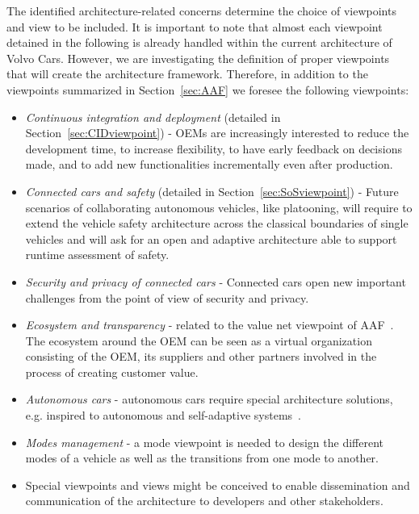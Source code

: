 The identified architecture-related concerns determine the choice of viewpoints and view to be included. 
It is important to note that almost each viewpoint detained in the following is already handled within the current architecture of Volvo Cars. However, we are investigating the definition of proper viewpoints that will create the architecture framework. %
Therefore, in addition to the viewpoints summarized in Section~\ref{sec:AAF} we foresee the following viewpoints:
	\begin{itemize}
	\item \emph{Continuous integration and deployment} (detailed in Section~\ref{sec:CIDviewpoint}) - OEMs are increasingly interested to reduce the development time, to increase flexibility, to have early feedback on decisions made, and to add new functionalities incrementally even after production. %
	\item \emph{Connected cars and safety} (detailed in Section~\ref{sec:SoSviewpoint}) - Future scenarios of collaborating autonomous vehicles, like platooning, will require to extend the vehicle safety architecture across the classical boundaries of single vehicles and will ask for an open and adaptive architecture able to support runtime assessment of safety. 
	\item \emph{Security and privacy of connected cars} - Connected cars open new important challenges from the point of view of security and privacy.
	\item \emph{Ecosystem and transparency} - related to the value net viewpoint of AAF~\cite{TUM-I0915,Broy}. %
	The ecosystem around the OEM can be seen as a virtual %
organization consisting of the OEM, its suppliers and other partners %
involved in the process of creating customer value.
	\item \emph{Autonomous cars} - autonomous cars require special architecture solutions, e.g. inspired to autonomous and self-adaptive systems~\cite{Salehie2009}.
	\item \emph{Modes management} - a mode viewpoint is needed to design the different modes of a vehicle as well as the transitions from one mode to another.
	\item Special viewpoints and views might be conceived to enable dissemination and communication of the architecture to developers and other stakeholders.
	\end{itemize}

